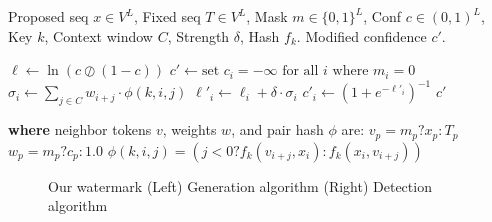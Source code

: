 \begin{minipage}[t]{0.6\textwidth}
\vspace{0pt}
\vspace{-3mm}
\begin{algorithm}[H]
\caption{Watermark Generation}
\begin{algorithmic}[1]
\Require Proposed seq $x \in V^L$, Fixed seq $T \in V^L$, Mask $m \in \{0,1\}^L$, Conf $c \in (0,1)^L$, Key $k$, Context window $C$, Strength $\delta$, Hash $f_k$.
\Ensure Modified confidence $c'$.

\State $\ell \gets \ln(c \oslash (1 - c))$ 
\State $c' \gets \text{set } c_i = -\infty \text{ for all } i \text{ where } m_i = 0$
    \State $\sigma_i \gets \sum_{j \in C} w_{i+j} \cdot \phi(k, i, j)$ 
    \State $\ell'_i \gets \ell_i + \delta \cdot \sigma_i$ 
    \State $c'_i \gets (1 + e^{-\ell'_i})^{-1}$ 
\EndFor
\State \Return $c'$

\Statex \textbf{where} neighbor tokens $v$, weights $w$, and pair hash $\phi$ are:
\Statex $v_{p} = m_{p} ? x_{p} : T_{p}$ 
\Statex $w_{p} = m_{p} ? c_{p} : 1.0$ 
\Statex $\phi(k, i, j) = (j < 0 ? f_k(v_{i+j}, x_i) : f_k(x_i, v_{i+j}))$
\end{algorithmic}
\end{algorithm}
\end{minipage}

\begin{figure}[t]
    \centering
    
    \caption{Our watermark (Left) Generation algorithm (Right) Detection algorithm}
    \label{fig:genalgoformal}
\end{figure}
